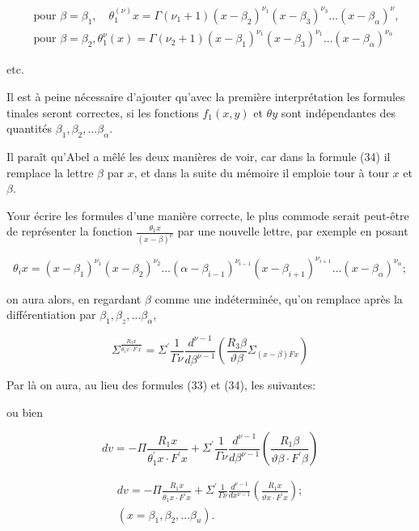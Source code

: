 \documentclass{article}
\begin{document}
\[
\begin{aligned}
& \text { pour } \beta=\beta_{1}, \quad \theta_{1}^{(\nu)} x=\Gamma\left(\nu_{1}+1\right)\left(x-\beta_{2}\right)^{\nu_{1}}\left(x-\beta_{3}\right)^{\nu_{3}} \ldots\left(x-\beta_{\alpha}\right)^{\nu}, \\
& \text { pour } \beta=\beta_{2}, \theta_{1}^{\nu}(x)=\Gamma\left(\nu_{2}+1\right)\left(x-\beta_{1}\right)^{\nu_{1}}\left(x-\beta_{3}\right)^{\nu_{1}} \ldots\left(x-\beta_{\alpha}\right)^{\nu_{\alpha}}
\end{aligned}
\]

etc.

Il est à peine nécessaire d'ajouter qu'avec la première interprétation les formules tinales seront correctes, si les fonctions \(f_{1}(x, y)\) et \(\theta y\) sont indépendantes des quantités \(\beta_{1}, \beta_{2}, \ldots \beta_{\alpha}\).

Il paraît qu'Abel a mêlé les deux manières de voir, car dans la formule (34) il remplace la lettre \(\beta\) par \(x\), et dans la suite du mémoire il emploie tour à tour \(x\) et \(\beta\).

Your écrire les formules d'une manière correcte, le plus commode serait peut-être de représenter la fonction \(\frac{\theta_{1} x}{(x-\beta)^{\nu}}\) par une nouvelle lettre, par exemple en posant

\[
\theta_{i} x=\left(x-\beta_{1}\right)^{\nu_{1}}\left(x-\beta_{2}\right)^{\nu_{2}} \ldots\left(\alpha-\beta_{i-1}\right)^{\nu_{i-1}}\left(x-\beta_{i+1}\right)^{\nu_{i+1}} \ldots\left(x-\beta_{\alpha}\right)^{\nu_{\alpha}} ;
\]

on aura alors, en regardant \(\beta\) comme une indéterminée, qu'on remplace après la différentiation par \(\beta_{1}, \beta_{z}, \ldots \beta_{\alpha}\),

\[
\Sigma^{\frac{R_{3} x}{\theta_{1} x \cdot F^{\prime} x}}=\Sigma^{\prime} \frac{1}{\Gamma \nu} \frac{d^{\nu-1}}{d \beta^{\nu-1}}\left(\frac{R_{3} \beta}{\vartheta \beta} \Sigma_{(x-\beta) F x}\right)
\]

Par là on aura, au lieu des formules (33) et (34), les suivantes:

ou bien

\[
d v=-\Pi \frac{R_{1} x}{\theta_{1}^{\prime} x \cdot F^{\prime} x}+\Sigma^{\prime} \frac{1}{\Gamma \nu} \frac{d^{\nu-1}}{d \beta^{\nu-1}}\left(\frac{R_{1} \beta}{\vartheta \beta \cdot F^{\prime} \beta}\right)
\]

\[
\begin{gathered}
d v=-\Pi \frac{R_{1} x}{\theta_{1} x \cdot F^{\prime} x}+\Sigma^{\prime} \frac{1}{\Gamma \nu} \frac{d^{\nu-1}}{d x^{\nu-1}}\left(\frac{R_{1} x}{\vartheta x \cdot F^{\prime} x}\right) ; \\
\left(x=\beta_{1}, \beta_{2}, \ldots \beta_{u}\right) .
\end{gathered}
\]
\end{document}
